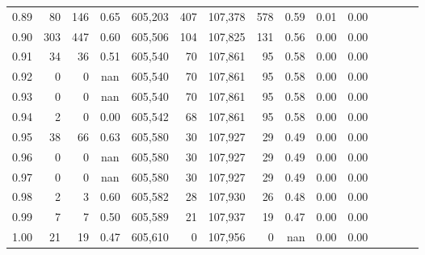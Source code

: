 \begin{tabular}{rrrcrrrrrrrrrrr}
0.89 &      80 &    146 &                                       0.65 &  605,203 &      407 &  107,378 &      578 &  0.59 &  0.01 &                         0.00 \\
0.90 &     303 &    447 &                                       0.60 &  605,506 &      104 &  107,825 &      131 &  0.56 &  0.00 &                         0.00 \\
0.91 &      34 &     36 &                                       0.51 &  605,540 &       70 &  107,861 &       95 &  0.58 &  0.00 &                         0.00 \\
0.92 &       0 &      0 &                                        nan &  605,540 &       70 &  107,861 &       95 &  0.58 &  0.00 &                         0.00 \\
0.93 &       0 &      0 &                                        nan &  605,540 &       70 &  107,861 &       95 &  0.58 &  0.00 &                         0.00 \\
0.94 &       2 &      0 &                                       0.00 &  605,542 &       68 &  107,861 &       95 &  0.58 &  0.00 &                         0.00 \\
0.95 &      38 &     66 &                                       0.63 &  605,580 &       30 &  107,927 &       29 &  0.49 &  0.00 &                         0.00 \\
0.96 &       0 &      0 &                                        nan &  605,580 &       30 &  107,927 &       29 &  0.49 &  0.00 &                         0.00 \\
0.97 &       0 &      0 &                                        nan &  605,580 &       30 &  107,927 &       29 &  0.49 &  0.00 &                         0.00 \\
0.98 &       2 &      3 &                                       0.60 &  605,582 &       28 &  107,930 &       26 &  0.48 &  0.00 &                         0.00 \\
0.99 &       7 &      7 &                                       0.50 &  605,589 &       21 &  107,937 &       19 &  0.47 &  0.00 &                         0.00 \\
1.00 &      21 &     19 &                                       0.47 &  605,610 &        0 &  107,956 &        0 &   nan &  0.00 &                         0.00 \\
\bottomrule
\end{tabular}

